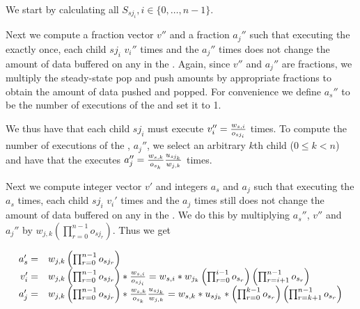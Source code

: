 We start by calculating all $S_{sj_i}, i \in \{0, \dots, n-1\}$.

Next we compute a fraction vector $v''$ and a fraction $a_j''$
such that executing the {\splitter} exactly once, each child
$sj_i$ $v_i''$ times and the {\joiner} $a_j''$ times does not
change the amount of data buffered on any {\Channel} in the
{\splitjoin}. Again, since $v''$ and $a_j''$ are fractions, we
multiply the steady-state pop and push amounts by appropriate
fractions to obtain the amount of data pushed and popped.  For
convenience we define $a_s''$ to be the number of executions of
the {\splitter} and set it to 1.

\begin{comment}
\begin{displaymath}
v'', a_j'', a_s'' \ne 0, \forall i \in \{0,\dots,n-1\}, a_s'' *
w_{s, i} = v_i'' * o_{sj_i}, v_i'' * u_{sj_i} = a_j'' * w_{j, i}
\end{displaymath}
\end{comment}

We thus have that each child $sj_i$ must execute $v_i'' = {w_{s,i}
\over o_{sj_i}}$ times. To compute the number of executions of the
{\joiner}, $a_j''$, we select an arbitrary $k$th child ($0 \le k <
n$) and have that the {\joiner} executes $a_j'' = {{w_{s,k} \over
o_{s_k}}{u_{sj_k} \over w_{j,k}}}$ times.

Next we compute integer vector $v'$ and integers $a_s$ and $a_j$
such that executing the {\splitter} $a_s$ times, each child $sj_i$
$v_i'$ times and the {\joiner} $a_j$ times still does not change
the amount of data buffered on any {\Channel} in the {\splitjoin}.
We do this by multiplying $a_s''$, $v''$ and $a_j''$ by $w_{j,k}
\left(\prod_{r=0}^{n-1}o_{sj_r}\right)$. Thus we get

\begin{displaymath}
\begin{array}{rl}
a_s' = & w_{j,k} \left(\prod_{r=0}^{n-1}o_{sj_r}\right) \\
v_i' = & w_{j,k} \left(\prod_{r=0}^{n-1}o_{sj_r}\right) * {w_{s,i}
\over o_{sj_i}} = w_{s,i} * w_{j_k} \left( \prod_{r=0}^{i-1}
o_{s_r} \right) \left( \prod_{r=i+1}^{n-1} o_{s_r} \right)
\\
a_j' = & w_{j,k} \left(\prod_{r=0}^{n-1}o_{sj_r}\right) *
{{w_{s,k} \over o_{s_k}}{u_{sj_k} \over w_{j,k}}} = w_{s,k} *
u_{sj_k} * \left( \prod_{r=0}^{k-1} o_{s_r} \right)
\left( \prod_{r=k+1}^{n-1} o_{s_r} \right) \\
\end{array}
\end{displaymath}

